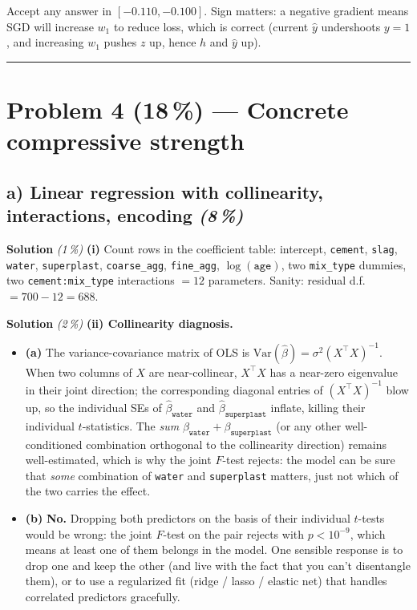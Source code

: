 \documentclass[11pt,a4paper]{article}
\newcommand{\points}[1]{\textbf{(#1\,\%)}}
\newcommand{\subpoints}[1]{\textit{(#1\,\%)}}
\newcommand{\sol}{\noindent\textbf{Solution}}
\begin{document}
Accept any answer in $[-0.110, -0.100]$. Sign matters: a negative gradient means SGD will increase
$w_1$ to reduce loss, which is correct (current $\hat y$ undershoots $y=1$, and increasing $w_1$
pushes $z$ up, hence $h$ and $\hat y$ up).

\vspace{0.6em}
\hrule
\vspace{1em}

\section*{Problem 4 \points{18} --- Concrete compressive strength}

\subsection*{a) Linear regression with collinearity, interactions, encoding \subpoints{8}}

\sol{} \subpoints{1} \textbf{(i)} Count rows in the coefficient table: intercept, \texttt{cement},
\texttt{slag}, \texttt{water}, \texttt{superplast}, \texttt{coarse\_agg}, \texttt{fine\_agg},
$\log(\texttt{age})$, two \texttt{mix\_type} dummies, two \texttt{cement:mix\_type} interactions
$=\boxed{12}$ parameters. Sanity: residual d.f.\ $= 700-12 = 688$. \checkmark

\medskip
\sol{} \subpoints{2} \textbf{(ii) Collinearity diagnosis.}
\begin{itemize}
  \item \textbf{(a)} The variance-covariance matrix of OLS is $\mathrm{Var}(\hat\beta) = \sigma^2
        (X^\top X)^{-1}$. When two columns of $X$ are near-collinear, $X^\top X$ has a near-zero
        eigenvalue in their joint direction; the corresponding diagonal entries of $(X^\top X)^{-1}$
        blow up, so the individual SEs of $\hat\beta_{\texttt{water}}$ and
        $\hat\beta_{\texttt{superplast}}$ inflate, killing their individual $t$-statistics. The
        \emph{sum} $\beta_{\texttt{water}}+\beta_{\texttt{superplast}}$ (or any other well-conditioned
        combination orthogonal to the collinearity direction) remains well-estimated, which is
        why the joint $F$-test rejects: the model can be sure that \emph{some} combination of
        \texttt{water} and \texttt{superplast} matters, just not which of the two carries the
        effect.
  \item \textbf{(b)} \textbf{No.} Dropping both predictors on the basis of their individual
        $t$-tests would be wrong: the joint $F$-test on the pair rejects with $p<10^{-9}$, which
        means at least one of them belongs in the model. One sensible response is to drop one and
        keep the other (and live with the fact that you can't disentangle them), or to use a
        regularized fit (ridge / lasso / elastic net) that handles correlated predictors
        gracefully.
\end{itemize}
\end{document}
